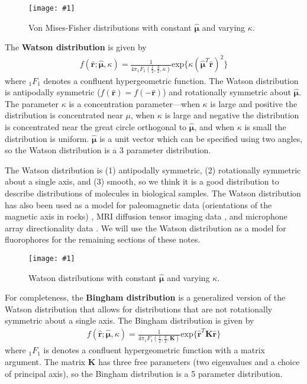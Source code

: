 \documentclass[11pt]{article}
\providecommand{\mb}[1]{\mathbf{#1}}
\providecommand{\mh}[1]{\mathbf{\hat{#1}}}
\providecommand{\bs}[1]{\boldsymbol{#1}}
\providecommand{\fig}[4]{
\begin{figure}[h]
 \captionsetup{width=1.0\linewidth}
 \centering
 \texttt{[image: \#1]}
 \caption{#3}
 \label{fig:#4}
\end{figure}
}
\begin{document}
\fig{../figures/vonmises.pdf}{1.0}{Von Mises-Fisher distributions with constant $\bs{\hat{\mu}}$ and varying $\kappa$. }{vonmises}

The \textbf{Watson distribution} \cite{sra2007modeling, jupp} is given by
\begin{align*}
  f(\mh{r}; \bs{\hat{\mu}}, \kappa) = \frac{1}{4\pi{}_1F_1\left(\frac{1}{2}, \frac{3}{2}, \kappa\right)}\text{exp}\{\kappa (\bs{\hat{\mu}}^T\mh{r})^2\}
\end{align*}
where ${}_1F_1$ denotes a confluent hypergeometric function. The Watson
distribution is antipodally symmetric ($f(\mh{r}) = f(-\mh{r})$) and
rotationally symmetric about $\bs{\hat{\mu}}$. The parameter $\kappa$ is a
concentration parameter---when $\kappa$ is large and positive the distribution
is concentrated near $\mu$, when $\kappa$ is large and negative the distribution
is concentrated near the great circle orthogonal to $\bs{\hat{\mu}}$, and when
$\kappa$ is small the distribution is uniform. $\bs{\hat{\mu}}$ is a unit vector
which can be specified using two angles, so the Watson distribution is a 3
parameter distribution.

The Watson distribution is (1) antipodally symmetric, (2) rotationally symmetric
about a single axis, and (3) smooth, so we think it is a good distribution to
describe distributions of molecules in biological samples. The Watson
distribution has also been used as a model for paleomagnetic data (orientations
of the magnetic axis in rocks) \cite{Love2007}, MRI diffusion tensor imaging
data \cite{Jespersen2012}, and microphone array directionality data
\cite{alex}. We will use the Watson distribution as a model for fluorophores for
the remaining sections of these notes.

\fig{../figures/watson.pdf}{1.0}{Watson distributions with constant
  $\bs{\hat{\mu}}$ and varying $\kappa$. }{watson}

For completeness, the \textbf{Bingham distribution} \cite{sra2007modeling, jupp}
is a generalized version of the Watson distribution that allows for
distributions that are not rotationally symmetric about a single axis. The
Bingham distribution is given by
\begin{align}
  f(\mh{r}; \bs{\hat{\mu}}, \kappa) = \frac{1}{4\pi{}_1F_1\left(\frac{1}{2}, \frac{3}{2}, \mb{K}\right)}\text{exp}\{\mh{r}^T\mb{K}\mh{r}\}
\end{align}
where ${}_1F_1$ is denotes a confluent hypergeometric function with a matrix
argument. The matrix $\mb{K}$ has three free parameters (two eigenvalues and a
choice of principal axis), so the Bingham distribution is a 5 parameter
distribution.
\end{document}
